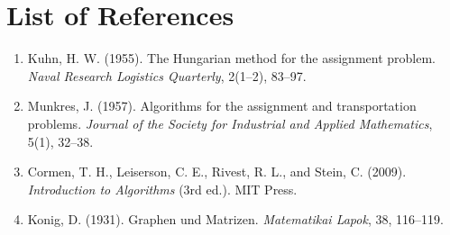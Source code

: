 \documentclass[12pt,a4paper]{article}
\begin{document}
\clearpage
{}
\section*{List of References}

\begin{enumerate}
    \item Kuhn, H. W. (1955). The Hungarian method for the assignment problem.
          \textit{Naval Research Logistics Quarterly}, 2(1--2), 83--97.
    \item Munkres, J. (1957). Algorithms for the assignment and transportation
          problems. \textit{Journal of the Society for Industrial and Applied
          Mathematics}, 5(1), 32--38.
    \item Cormen, T. H., Leiserson, C. E., Rivest, R. L., and Stein, C. (2009).
          \textit{Introduction to Algorithms} (3rd ed.). MIT Press.
    \item Konig, D. (1931). Graphen und Matrizen.
          \textit{Matematikai Lapok}, 38, 116--119.
\end{enumerate}
\end{document}
